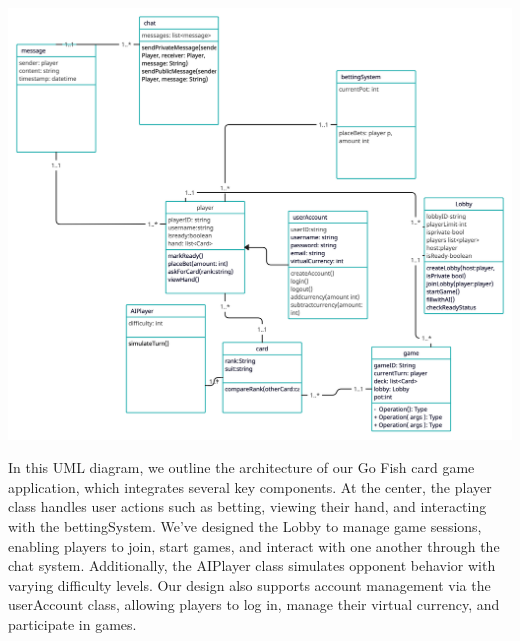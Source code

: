 \begin{center}
    \includegraphics[scale=0.2]{uml_diagram.png}
\end{center}
In this UML diagram, we outline the architecture of our Go Fish card game application, which integrates several key components. At the center, the player class handles user actions such as betting, viewing their hand, and interacting with the bettingSystem. We’ve designed the Lobby to manage game sessions, enabling players to join, start games, and interact with one another through the chat system. Additionally, the AIPlayer class simulates opponent behavior with varying difficulty levels. Our design also supports account management via the userAccount class, allowing players to log in, manage their virtual currency, and participate in games.